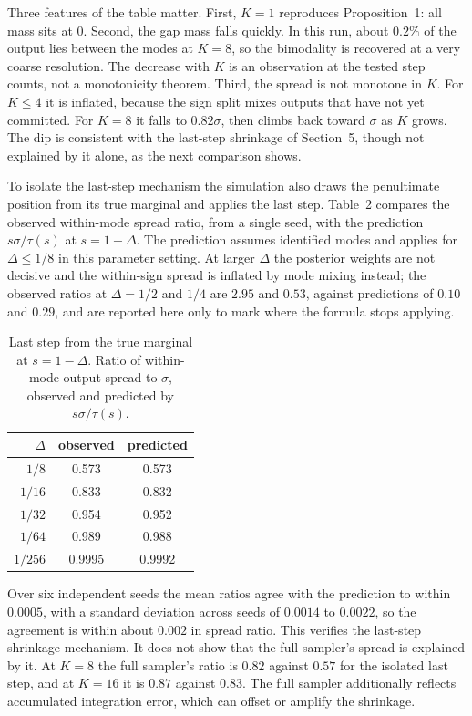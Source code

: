 \documentclass[11pt]{article}
\theoremstyle{definition}
\begin{document}
Three features of the table matter. First, $K=1$ reproduces Proposition~1: all mass sits at $0$. Second, the gap mass falls quickly. In this run, about $0.2\%$ of the output lies between the modes at $K=8$, so the bimodality is recovered at a very coarse resolution. The decrease with $K$ is an observation at the tested step counts, not a monotonicity theorem. Third, the spread is not monotone in $K$. For $K\le4$ it is inflated, because the sign split mixes outputs that have not yet committed. For $K=8$ it falls to $0.82\sigma$, then climbs back toward $\sigma$ as $K$ grows. The dip is consistent with the last-step shrinkage of Section~5, though not explained by it alone, as the next comparison shows.

To isolate the last-step mechanism the simulation also draws the penultimate position from its true marginal and applies the last step. Table~2 compares the observed within-mode spread ratio, from a single seed, with the prediction $s\sigma/\tau(s)$ at $s=1-\Delta$. The prediction assumes identified modes and applies for $\Delta\le1/8$ in this parameter setting. At larger $\Delta$ the posterior weights are not decisive and the within-sign spread is inflated by mode mixing instead; the observed ratios at $\Delta=1/2$ and $1/4$ are $2.95$ and $0.53$, against predictions of $0.10$ and $0.29$, and are reported here only to mark where the formula stops applying.

\begin{table}[t]
\centering
\caption{Last step from the true marginal at $s=1-\Delta$. Ratio of within-mode output spread to $\sigma$, observed and predicted by $s\sigma/\tau(s)$.}
\begin{tabular}{rcc}
\toprule
$\Delta$ & observed & predicted \\
\midrule
$1/8$   & 0.573 & 0.573 \\
$1/16$  & 0.833 & 0.832 \\
$1/32$  & 0.954 & 0.952 \\
$1/64$  & 0.989 & 0.988 \\
$1/256$ & 0.9995 & 0.9992 \\
\bottomrule
\end{tabular}
\end{table}

Over six independent seeds the mean ratios agree with the prediction to within $0.0005$, with a standard deviation across seeds of $0.0014$ to $0.0022$, so the agreement is within about $0.002$ in spread ratio. This verifies the last-step shrinkage mechanism. It does not show that the full sampler's spread is explained by it. At $K=8$ the full sampler's ratio is $0.82$ against $0.57$ for the isolated last step, and at $K=16$ it is $0.87$ against $0.83$. The full sampler additionally reflects accumulated integration error, which can offset or amplify the shrinkage.
\end{document}
